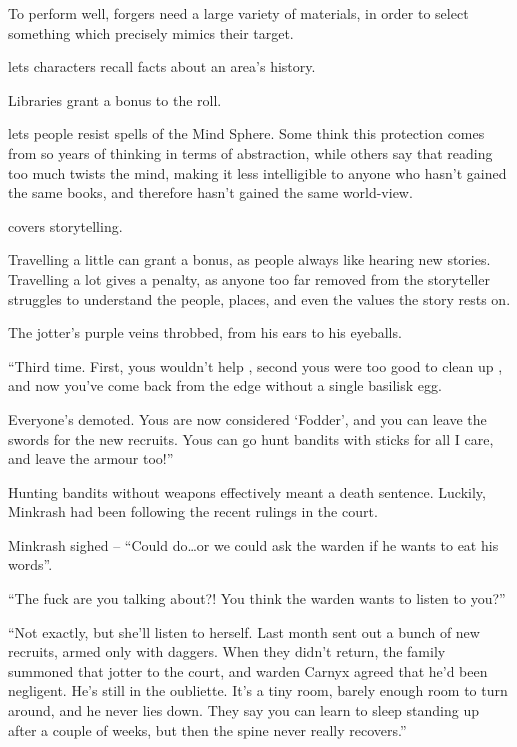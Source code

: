 \begin{multicols}{2}
\begin{description}
    To perform well, forgers need a large variety of materials, in order to select something which precisely mimics their target.
  \item[\roll{Intelligence}{Academics}]
    lets characters recall facts about an area's history.

    Libraries grant a bonus to the roll.
  \item[\roll{Wits}{Academics}]
    lets people resist spells of the Mind Sphere.
    Some think this protection comes from so years of thinking in terms of abstraction, while others say that reading too much twists the mind, making it less intelligible to anyone who hasn't gained the same books, and therefore hasn't gained the same world-view.
  \item[\roll{Charisma}{Academics}]
    covers storytelling.

    Travelling a little can grant a bonus, as people always like hearing new stories.
    Travelling a lot gives a penalty, as anyone too far removed from the storyteller struggles to understand the people, places, and even the values the story rests on.
\end{description}

\begin{exampletext}

  The \gls{jotter}'s purple veins throbbed, from his ears to his eyeballs.

  ``Third time.
  First, yous wouldn't help , second yous were too good to clean up , and now you've come back from the \gls{edge} without a single basilisk egg.

  Everyone's demoted.
  Yous are now considered `Fodder', and you can leave the swords for the new recruits.
  Yous can go hunt bandits with sticks for all I care, and leave the armour too!''

  Hunting bandits without weapons effectively meant a death sentence.
  Luckily, Minkrash had been following the recent rulings in the \gls{court}.

  Minkrash sighed -- ``Could do\ldots or we could ask the \gls{warden} if he wants to eat his words''.

  ``The fuck are you talking about?!
  You think the \gls{warden} wants to listen to you?''

  ``Not exactly, but she'll listen to herself.
  Last month  sent out a bunch of new recruits, armed only with daggers.
  When they didn't return, the family summoned that \gls{jotter} to the \gls{court}, and \gls{warden} Carnyx agreed that he'd been negligent.
  He's still in the oubliette.
  It's a tiny room, barely enough room to turn around, and he never lies down.
  They say you can learn to sleep standing up after a couple of weeks, but then the spine never really recovers.''


\end{exampletext}
\end{multicols}

